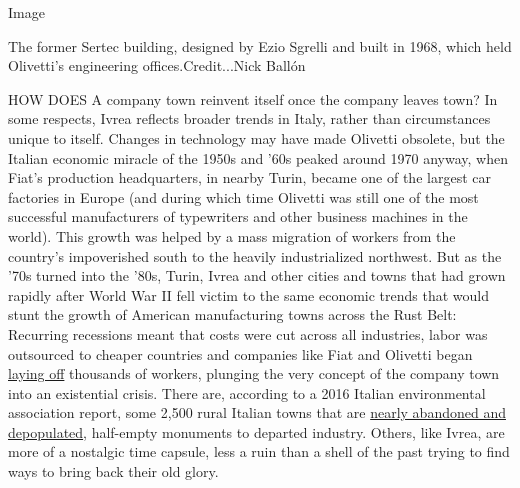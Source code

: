 Image

The former Sertec building, designed by Ezio Sgrelli and built in 1968,
which held Olivetti's engineering offices.Credit...Nick Ballón

HOW DOES A company town reinvent itself once the company leaves town? In
some respects, Ivrea reflects broader trends in Italy, rather than
circumstances unique to itself. Changes in technology may have made
Olivetti obsolete, but the Italian economic miracle of the 1950s and
'60s peaked around 1970 anyway, when Fiat's production headquarters, in
nearby Turin, became one of the largest car factories in Europe (and
during which time Olivetti was still one of the most successful
manufacturers of typewriters and other business machines in the world).
This growth was helped by a mass migration of workers from the country's
impoverished south to the heavily industrialized northwest. But as the
'70s turned into the '80s, Turin, Ivrea and other cities and towns that
had grown rapidly after World War II fell victim to the same economic
trends that would stunt the growth of American manufacturing towns
across the Rust Belt: Recurring recessions meant that costs were cut
across all industries, labor was outsourced to cheaper countries and
companies like Fiat and Olivetti began
\href{https://www.nytimes.com/1982/04/02/business/fiat-layoffs-set.html}{laying
off} thousands of workers, plunging the very concept of the company town
into an existential crisis. There are, according to a 2016 Italian
environmental association report, some 2,500 rural Italian towns that
are
\href{https://www.nytimes.com/2017/09/07/t-magazine/abandoned-italian-towns.html}{nearly
abandoned and depopulated}, half-empty monuments to departed industry.
Others, like Ivrea, are more of a nostalgic time capsule, less a ruin
than a shell of the past trying to find ways to bring back their old
glory.

